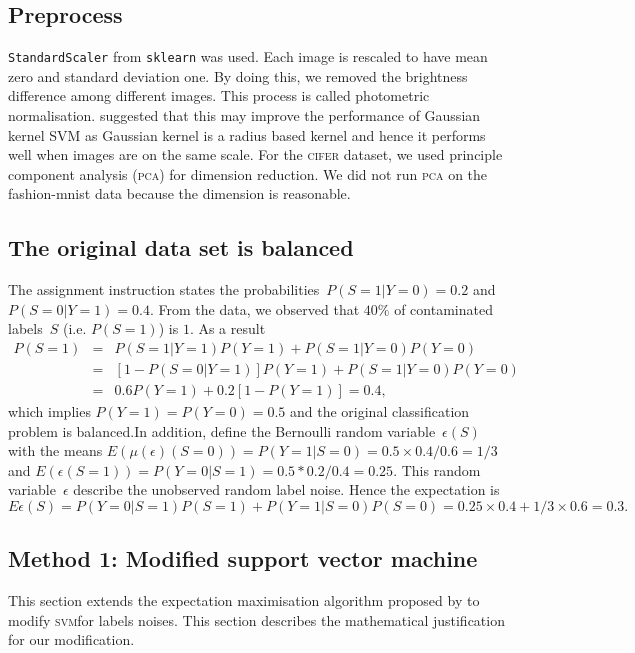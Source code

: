 \documentclass{article} %
\newcommand{\svm}{\textsc{svm}}
\begin{document}
\subsection{Preprocess}
\texttt{StandardScaler} from \texttt{sklearn} was used. Each image is rescaled to have mean zero and standard deviation one. By doing this, we removed the brightness difference among different images. This process is called photometric normalisation. \citet{jonsson2002support} suggested that this may improve the performance of Gaussian kernel SVM as Gaussian kernel is a radius based kernel and hence it performs well when images are on the same scale. For the \textsc{cifer} dataset, we used principle component analysis (\textsc{pca}) for dimension reduction. We did not run \textsc{pca} on the fashion-mnist data because the dimension is reasonable.

\subsection{The original data set is balanced} \label{sec:1}
The assignment instruction states the probabilities~$P(S=1|Y=0)=0.2$ and $P(S=0|Y=1)=0.4$. From the data, we observed that $40\%$ of contaminated labels~$S$ (i.e. $P(S=1)$) is $1$. As a result
\begin{eqnarray*}
P(S=1)&=&P(S=1|Y=1)P(Y=1)+P(S=1|Y=0)P(Y=0)\\
     &=&\left[1-P(S=0|Y=1)\right]P(Y=1)+P(S=1|Y=0)P(Y=0)\\
     &=&0.6P(Y=1)+0.2\left[1-P(Y=1)\right]=0.4, \nonumber
\end{eqnarray*}
which implies $P(Y=1)=P(Y=0)=0.5$ and the original classification problem is balanced.In addition, define the Bernoulli random variable~$\epsilon(S)$ with the means $E(\mu(\epsilon)(S=0))=P(Y=1|S=0)=0.5\times0.4/0.6=1/3$ and $E(\epsilon(S=1))=P(Y=0|S=1)=0.5*0.2/0.4=0.25$. This random variable~$\epsilon$ describe the unobserved random label noise. Hence the expectation is
\begin{equation}
    E\epsilon(S)=P(Y=0|S=1)P(S=1)+P(Y=1|S=0)P(S=0)=0.25\times 0.4+1/3\times0.6=0.3.\label{eq:exp}
\end{equation}
\subsection{Method 1: Modified support vector machine}\label{1st}
This section extends the expectation maximisation algorithm proposed by \citet{pmlr-v20-biggio11} to modify \svm for labels noises. This section describes the mathematical justification for our modification.
\end{document}
